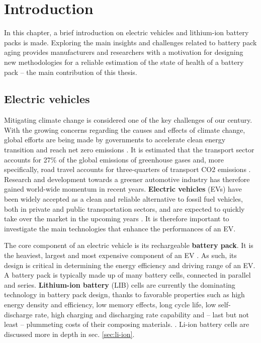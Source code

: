 \chapter{Introduction}
\label{sec:intro}

In this chapter, a brief introduction on electric vehicles and lithium-ion battery packs is made. Exploring the main insights and challenges related to battery pack aging provides manufacturers and researchers with a motivation for designing new methodologies for a reliable estimation of the state of health of a battery pack -- the main contribution of this thesis.

\section{Electric vehicles}
\label{sec:ev}
Mitigating climate change is considered one of the key challenges of our century. With the growing concerns regarding the causes and effects of climate change, global efforts are being made by governments to accelerate clean energy transition and reach net zero emissions \cite{iea_net_zero}. It is estimated that the transport sector accounts for 27\% of the global emissions of greenhouse gases \cite{iea_emissions} and, more specifically, road travel accounts for three-quarters of transport CO2 emissions \cite{iea_transport_emissions}. Research and development towards a greener automotive industry has therefore gained world-wide momentum in recent years. \textbf{Electric vehicles} (EVs) have been widely accepted as a clean and reliable alternative to fossil fuel vehicles, both in private and public transportation sectors, and are expected to quickly take over the market in the upcoming years \cite{eea_report}. It is therefore important to investigate the main technologies that enhance the performances of an EV.

The core component of an electric vehicle is its rechargeable \textbf{battery pack}. It is the heaviest, largest and most expensive component of an EV \cite{heavy_bulky_expensive}. As such, its design is critical in determining the energy efficiency and driving range of an EV. A battery pack is typically made up of many battery cells, connected in parallel and series. \textbf{Lithium-ion battery} (LIB) cells are currently the dominating technology in battery pack design, thanks to favorable properties such as high energy density and efficiency, low memory effects, long cycle life, low self-discharge rate, high charging and discharging rate capability and -- last but not least -- plummeting costs of their composing materials. \cite{li-ion_data_where,li-ion_battery_properties,li-ion_plummeting_costs}. Li-ion battery cells are discussed more in depth in sec. \ref{sec:li-ion}.

